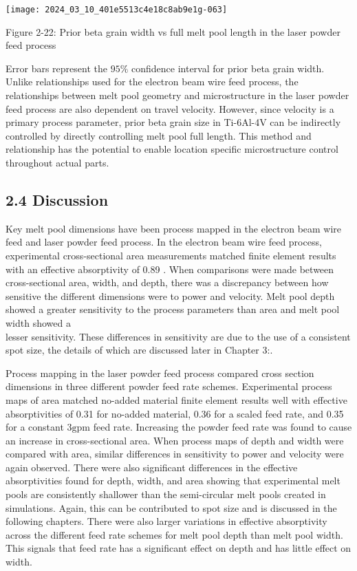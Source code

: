 \documentclass[10pt]{article}
\begin{document}
\begin{center}
\texttt{[image: 2024\_03\_10\_401e5513c4e18c8ab9e1g-063]}
\end{center}

Figure 2-22: Prior beta grain width vs full melt pool length in the laser powder feed process

Error bars represent the $95 \%$ confidence interval for prior beta grain width. Unlike relationships used for the electron beam wire feed process, the relationships between melt pool geometry and microstructure in the laser powder feed process are also dependent on travel velocity. However, since velocity is a primary process parameter, prior beta grain size in Ti-6Al-4V can be indirectly controlled by directly controlling melt pool full length. This method and relationship has the potential to enable location specific microstructure control throughout actual parts.

\subsection*{2.4 Discussion}
Key melt pool dimensions have been process mapped in the electron beam wire feed and laser powder feed process. In the electron beam wire feed process, experimental cross-sectional area measurements matched finite element results with an effective absorptivity of 0.89 . When comparisons were made between cross-sectional area, width, and depth, there was a discrepancy between how sensitive the different dimensions were to power and velocity. Melt pool depth showed a greater sensitivity to the process parameters than area and melt pool width showed a\\
lesser sensitivity. These differences in sensitivity are due to the use of a consistent spot size, the details of which are discussed later in Chapter 3:.

Process mapping in the laser powder feed process compared cross section dimensions in three different powder feed rate schemes. Experimental process maps of area matched no-added material finite element results well with effective absorptivities of 0.31 for no-added material, 0.36 for a scaled feed rate, and 0.35 for a constant $3 \mathrm{gpm}$ feed rate. Increasing the powder feed rate was found to cause an increase in cross-sectional area. When process maps of depth and width were compared with area, similar differences in sensitivity to power and velocity were again observed. There were also significant differences in the effective absorptivities found for depth, width, and area showing that experimental melt pools are consistently shallower than the semi-circular melt pools created in simulations. Again, this can be contributed to spot size and is discussed in the following chapters. There were also larger variations in effective absorptivity across the different feed rate schemes for melt pool depth than melt pool width. This signals that feed rate has a significant effect on depth and has little effect on width.
\end{document}
